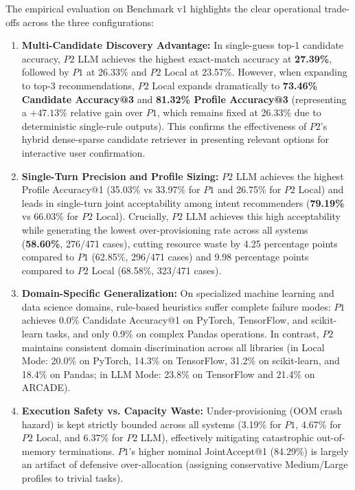 

The empirical evaluation on Benchmark v1 highlights the clear operational trade-offs across the three configurations:
\begin{enumerate}
    \item \textbf{Multi-Candidate Discovery Advantage:} In single-guess top-1 candidate accuracy, $P2$ LLM achieves the highest exact-match accuracy at \textbf{27.39\%}, followed by $P1$ at 26.33\% and $P2$ Local at 23.57\%. However, when expanding to top-3 recommendations, $P2$ Local expands dramatically to \textbf{73.46\% Candidate Accuracy@3} and \textbf{81.32\% Profile Accuracy@3} (representing a $+47.13\%$ relative gain over $P1$, which remains fixed at 26.33\% due to deterministic single-rule outputs). This confirms the effectiveness of $P2$'s hybrid dense-sparse candidate retriever in presenting relevant options for interactive user confirmation.
    \item \textbf{Single-Turn Precision and Profile Sizing:} $P2$ LLM achieves the highest Profile Accuracy@1 (35.03\% vs 33.97\% for $P1$ and 26.75\% for $P2$ Local) and leads in single-turn joint acceptability among intent recommenders (\textbf{79.19\%} vs 66.03\% for $P2$ Local). Crucially, $P2$ LLM achieves this high acceptability while generating the lowest over-provisioning rate across all systems (\textbf{58.60\%}, 276/471 cases), cutting resource waste by 4.25 percentage points compared to $P1$ (62.85\%, 296/471 cases) and 9.98 percentage points compared to $P2$ Local (68.58\%, 323/471 cases).
    \item \textbf{Domain-Specific Generalization:} On specialized machine learning and data science domains, rule-based heuristics suffer complete failure modes: $P1$ achieves 0.0\% Candidate Accuracy@1 on PyTorch, TensorFlow, and scikit-learn tasks, and only 0.9\% on complex Pandas operations. In contrast, $P2$ maintains consistent domain discrimination across all libraries (in Local Mode: 20.0\% on PyTorch, 14.3\% on TensorFlow, 31.2\% on scikit-learn, and 18.4\% on Pandas; in LLM Mode: 23.8\% on TensorFlow and 21.4\% on ARCADE).
    \item \textbf{Execution Safety vs. Capacity Waste:} Under-provisioning (OOM crash hazard) is kept strictly bounded across all systems (3.19\% for $P1$, 4.67\% for $P2$ Local, and 6.37\% for $P2$ LLM), effectively mitigating catastrophic out-of-memory terminations. $P1$'s higher nominal JointAccept@1 (84.29\%) is largely an artifact of defensive over-allocation (assigning conservative Medium/Large profiles to trivial tasks).

\end{enumerate}
